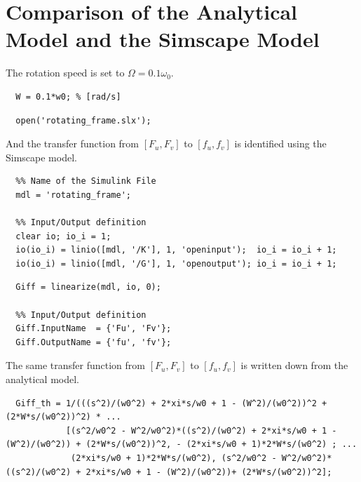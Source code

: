 \documentclass[a4paper, 10pt, DIV=12, parskip=full]{scrreprt}
\begin{document}
\section{Comparison of the Analytical Model and the Simscape Model}
\label{sec:org5d37f2f}
The rotation speed is set to \(\Omega = 0.1 \omega_0\).
\begin{verbatim}
  W = 0.1*w0; % [rad/s]
\end{verbatim}

\begin{verbatim}
  open('rotating_frame.slx');
\end{verbatim}

And the transfer function from \([F_u, F_v]\) to \([f_u, f_v]\) is identified using the Simscape model.
\begin{verbatim}
  %% Name of the Simulink File
  mdl = 'rotating_frame';

  %% Input/Output definition
  clear io; io_i = 1;
  io(io_i) = linio([mdl, '/K'], 1, 'openinput');  io_i = io_i + 1;
  io(io_i) = linio([mdl, '/G'], 1, 'openoutput'); io_i = io_i + 1;
\end{verbatim}

\begin{verbatim}
  Giff = linearize(mdl, io, 0);

  %% Input/Output definition
  Giff.InputName  = {'Fu', 'Fv'};
  Giff.OutputName = {'fu', 'fv'};
\end{verbatim}

The same transfer function from \([F_u, F_v]\) to \([f_u, f_v]\) is written down from the analytical model.
\begin{verbatim}
  Giff_th = 1/(((s^2)/(w0^2) + 2*xi*s/w0 + 1 - (W^2)/(w0^2))^2 + (2*W*s/(w0^2))^2) * ...
            [(s^2/w0^2 - W^2/w0^2)*((s^2)/(w0^2) + 2*xi*s/w0 + 1 - (W^2)/(w0^2)) + (2*W*s/(w0^2))^2, - (2*xi*s/w0 + 1)*2*W*s/(w0^2) ; ...
             (2*xi*s/w0 + 1)*2*W*s/(w0^2), (s^2/w0^2 - W^2/w0^2)*((s^2)/(w0^2) + 2*xi*s/w0 + 1 - (W^2)/(w0^2))+ (2*W*s/(w0^2))^2];
\end{verbatim}
\end{document}
